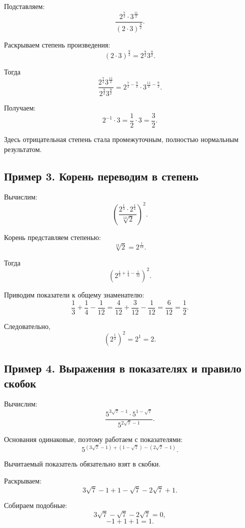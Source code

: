 \documentclass[a4paper,12pt]{article}
\begin{document}
Подставляем:
\[
\frac{2^{\frac72}\cdot3^{\frac{11}{2}}}
     {(2\cdot3)^{\frac92}}.
\]

Раскрываем степень произведения:
\[
(2\cdot3)^{\frac92}
=
2^{\frac92}3^{\frac92}.
\]

Тогда
\[
\frac{2^{\frac72}3^{\frac{11}{2}}}
     {2^{\frac92}3^{\frac92}}
=
2^{\frac72-\frac92}
\cdot
3^{\frac{11}{2}-\frac92}.
\]

Получаем:
\[
2^{-1}\cdot3
=
\frac12\cdot3
=
\boxed{\frac32}.
\]

Здесь отрицательная степень стала промежуточным,
полностью нормальным результатом.

\subsection*{\color{accent}Пример 3. Корень переводим в степень}

Вычислим:
\[
\left(
\frac{
2^{\frac13}\cdot2^{\frac14}
}{
\sqrt[12]{2}
}
\right)^2.
\]

Корень представляем степенью:
\[
\sqrt[12]{2}=2^{\frac1{12}}.
\]

Тогда
\[
\left(
2^{\frac13+\frac14-\frac1{12}}
\right)^2.
\]

Приводим показатели к общему знаменателю:
\[
\frac13+\frac14-\frac1{12}
=
\frac4{12}+\frac3{12}-\frac1{12}
=
\frac6{12}
=
\frac12.
\]

Следовательно,
\[
\left(2^{\frac12}\right)^2
=
2^1
=
\boxed{2}.
\]

\subsection*{\color{accent}Пример 4. Выражения в показателях и правило скобок}

Вычислим:
\[
\frac{
5^{3\sqrt7-1}\cdot5^{1-\sqrt7}
}{
5^{2\sqrt7-1}
}.
\]

Основания одинаковые, поэтому работаем с показателями:
\[
5^{
(3\sqrt7-1)
+
(1-\sqrt7)
-
(2\sqrt7-1)
}.
\]

Вычитаемый показатель обязательно взят в скобки.

Раскрываем:
\[
3\sqrt7-1+1-\sqrt7-2\sqrt7+1.
\]

Собираем подобные:
\[
3\sqrt7-\sqrt7-2\sqrt7=0,
\]
\[
-1+1+1=1.
\]
\end{document}
